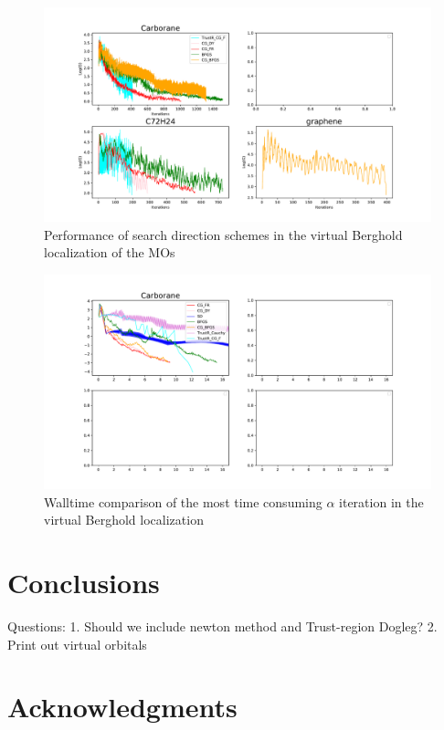 \documentclass[aps,prl,reprint,amsmath,amssymb]{revtex4-1}
\begin{document}
\begin{figure}[htb]
\centering
\includegraphics[width=\textwidth]{virtual_grad.pdf}
\caption{Performance of search direction schemes in the virtual Berghold localization of the MOs}
\label{fig:vir_grad}
\end{figure}


\begin{figure}[htb]
\centering
\includegraphics[width=\textwidth]{virtual_walltime.pdf}
\caption{Walltime comparison of the most time consuming $\alpha$ iteration in the virtual Berghold localization}
\label{fig:vir_walltime}
\end{figure}


\section{Conclusions}

Questions:
1. Should we include newton method and Trust-region Dogleg?
2. Print out virtual orbitals

\section{Acknowledgments} 


%

\end{document}
